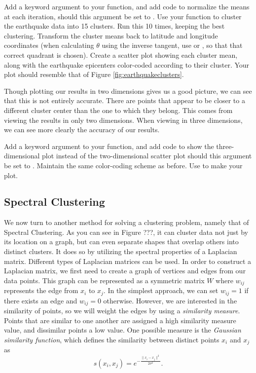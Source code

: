 \begin{problem}
Add a keyword argument  to your  function, and add code to normalize the means at each iteration, should this argument be set to .
Use your function to cluster the earthquake data into 15 clusters. Run this 10 times, keeping the best clustering.
Transform the cluster means back to latitude and longitude coordinates (when calculating $\theta$ using the inverse tangent, use  or ,
so that that correct quadrant is chosen).
Create a scatter plot showing each cluster mean, along with the earthquake epicenters color-coded according to their cluster. Your plot should resemble that of Figure \ref{fig:earthquakeclusters}.
\end{problem}

Though plotting our results in two dimensions gives us a good picture, we can see that this is not entirely accurate.  There are points that appear to be closer to a different cluster center than the one to which they belong.  This comes from viewing the results in only two dimensions.  When viewing in three dimensions, we can see more clearly the accuracy of our results.  
\begin{problem}
Add a keyword argument  to your  function, and add code to show the three-dimensional plot instead of the two-dimensional scatter plot should this argument be set to .  Maintain the same color-coding scheme as before.  Use  to make your plot.
\end{problem}


\subsection*{Spectral Clustering}
We now turn to another method for solving a clustering problem, namely that of Spectral Clustering.  As you can see in Figure ???, it can cluster data not just by its location on a graph, but can even separate shapes that overlap others into distinct clusters.  It does so by utilizing the spectral properties of a Laplacian matrix.  Different types of Laplacian matrices can be used.  In order to construct a Laplacian matrix, we first need to create a graph of vertices and edges from our data points.  This graph can be represented as a symmetric matrix $W$ where $w_{ij}$ represents the edge from $x_i$ to $x_j$.  In the simplest approach, we can set $w_{ij} = 1$ if there exists an edge and $w_{ij} = 0$ otherwise.  However, we are interested in the similarity of points, so we will weight the edges by using a \emph{similarity measure}.  Points that are similar to one another are assigned a high similarity measure value, and dissimilar points a low value.  One possible measure is the \emph{Gaussian similarity function}, which defines the similarity between distinct points $x_i$ and $x_j$ as
\begin{equation*}
s(x_i,x_j) = e^{- \frac{\| x_i - x_j \| ^2}{2 \sigma ^2}} .
\end{equation*}

